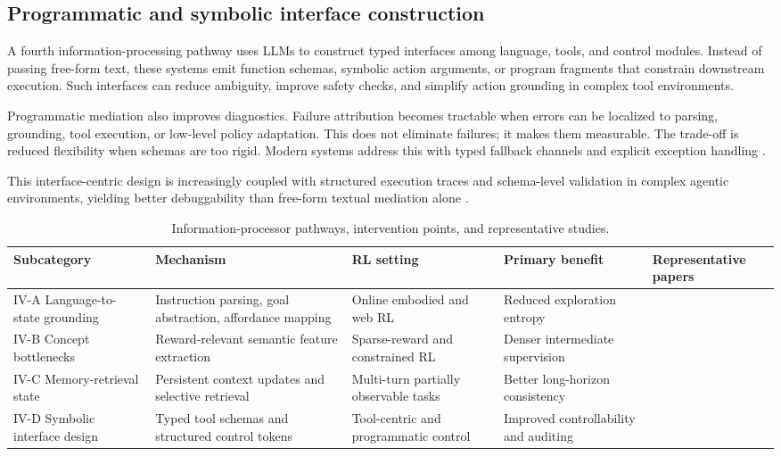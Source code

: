 \documentclass[pdflatex,sn-mathphys-num]{sn-jnl}
\begin{document}
\subsection{Programmatic and symbolic interface construction}
A fourth information-processing pathway uses LLMs to construct typed interfaces among language, tools, and control modules. Instead of passing free-form text, these systems emit function schemas, symbolic action arguments, or program fragments that constrain downstream execution. Such interfaces can reduce ambiguity, improve safety checks, and simplify action grounding in complex tool environments.

Programmatic mediation also improves diagnostics. Failure attribution becomes tractable when errors can be localized to parsing, grounding, tool execution, or low-level policy adaptation. This does not eliminate failures; it makes them measurable. The trade-off is reduced flexibility when schemas are too rigid. Modern systems address this with typed fallback channels and explicit exception handling \cite{doi_p_10_3390_make8010022,arxiv_p_2512_20275,arxiv_p_2602_03022,doi_p_10_1609_icaps_v34i1_31503}.

This interface-centric design is increasingly coupled with structured execution traces and schema-level validation in complex agentic environments, yielding better debuggability than free-form textual mediation alone \cite{arxiv_p_2509_12867,arxiv_p_2509_14480,arxiv_p_2510_18383,arxiv_p_2602_00528}.

\begin{table}[t]
\centering
\footnotesize
\setlength{\tabcolsep}{4pt}
\begin{tabularx}{\textwidth}{P{2.2cm}P{3.2cm}P{2.0cm}P{2.0cm}Y}
\toprule
\textbf{Subcategory} & \textbf{Mechanism} & \textbf{RL setting} & \textbf{Primary benefit} & \textbf{Representative papers}\\
\midrule
IV-A Language-to-state grounding & Instruction parsing, goal abstraction, affordance mapping & Online embodied and web RL & Reduced exploration entropy & \cite{arxiv_p_2204_01691,doi_p_10_1109_icra48891_2023_10160591,arxiv_p_2310_17722}\\
IV-B Concept bottlenecks & Reward-relevant semantic feature extraction & Sparse-reward and constrained RL & Denser intermediate supervision & \cite{arxiv_p_2303_00001,arxiv_p_2309_06687,arxiv_p_2510_10197}\\
IV-C Memory-retrieval state & Persistent context updates and selective retrieval & Multi-turn partially observable tasks & Better long-horizon consistency & \cite{arxiv_p_2404_03648,arxiv_p_2511_14460,arxiv_p_2602_00994}\\
IV-D Symbolic interface design & Typed tool schemas and structured control tokens & Tool-centric and programmatic control & Improved controllability and auditing & \cite{doi_p_10_3390_make8010022,arxiv_p_2512_20275,arxiv_p_2602_03022}\\
\bottomrule
\end{tabularx}
\caption{Information-processor pathways, intervention points, and representative studies.}
\label{tab:t1_info}
\end{table}
\end{document}
